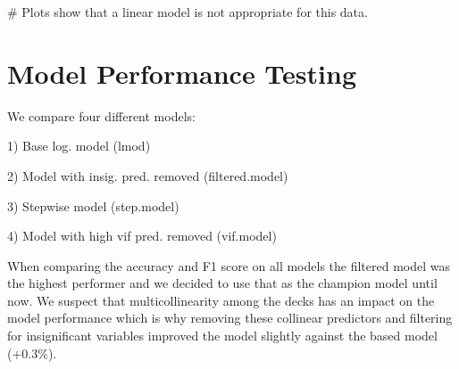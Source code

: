 \documentclass[
  letterpaper,
  DIV=11,
  numbers=noendperiod]{scrartcl}
\newenvironment{Shaded}{\begin{snugshade}}{\end{snugshade}}
\newcommand{\CommentTok}[1]{\textcolor[rgb]{0.37,0.37,0.37}{#1}}
\begin{document}
\begin{Shaded}
\begin{Highlighting}[]
\CommentTok{\# Plots show that a linear model is not appropriate for this data.}
\end{Highlighting}
\end{Shaded}

\section{Model Performance Testing}\label{model-performance-testing}

We compare four different models:

1) Base log. model (lmod)

2) Model with insig. pred. removed (filtered.model)

3) Stepwise model (step.model)

4) Model with high vif pred. removed (vif.model)

When comparing the accuracy and F1 score on all models the filtered
model was the highest performer and we decided to use that as the
champion model until now. We suspect that multicollinearity among the
decks has an impact on the model performance which is why removing these
collinear predictors and filtering for insignificant variables improved
the model slightly against the based model (+0.3\%).
\end{document}
